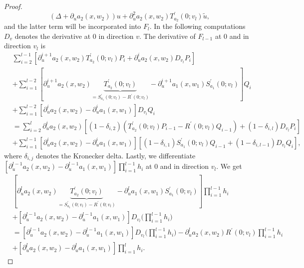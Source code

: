 \documentclass[11pt,a4paper]{amsart}
\theoremstyle{definition}
\numberwithin{equation}{section}
\begin{document}
\begin{proof}
\begin{equation*}
	(\Delta+\partial_{u}a_{2}(x,w_{2}))u + \partial_{u}^{2}a_{2}(x,w_{2})T_{a_{2}}^{\prime}(0;v_{l})\tilde{u},
\end{equation*}
and the latter term will be incorporated into \( F_{l} \).
In the following computations \( D_{v} \) denotes the derivative at \( 0 \) in direction \( v \).
The derivative of \( F_{l-1} \) at \( 0 \) and in direction \( v_{l} \) is
\begin{equation*}
\begin{aligned}
	&\sum_{i=2}^{l-1}[\partial_{u}^{i+1}a_{2}(x,w_{2})T_{a_{2}}^{\prime}(0;v_{l})P_{i} + \partial_{u}^{i}a_{2}(x,w_{2})D_{v_{l}}P_{i}] \\
	&+\sum_{i=1}^{l-2}[\partial_{u}^{i+1}a_{2}(x,w_{2})\underbrace{T_{a_{2}}^{\prime}(0;v_{l})}_{=S_{a_{1}}^{\prime}(0;v_{l})-R^{\prime}(0;v_{l})}-\partial_{u}^{i+1}a_{1}(x,w_{1})S_{a_{1}}^{\prime}(0;v_{l})]Q_{i} \\
	&+\sum_{i=1}^{l-2}[\partial_{u}^{i}a_{2}(x,w_{2})-\partial_{u}^{i}a_{1}(x,w_{1})]D_{v_{l}}Q_{i} \\
	&=\sum_{i=2}^{l}\partial_{u}^{i}a_{2}(x,w_{2})[(1-\delta_{i,2})(T_{a_{2}}^{\prime}(0;v_{l})P_{i-1} - R^{\prime}(0;v_{l})Q_{i-1}) + (1-\delta_{i,l})D_{v_{l}}P_{i}] \\
	&+\sum_{i=1}^{l-1}[\partial_{u}^{i}a_{2}(x,w_{2})-\partial_{u}^{i}a_{1}(x,w_{1})][(1-\delta_{i,1})S_{a_{1}}^{\prime}(0;v_{l})Q_{i-1} + (1-\delta_{i,l-1})D_{v_{l}}Q_{i}],
\end{aligned}
\end{equation*}
where \( \delta_{i,j} \) denotes the Kronecker delta.
Lastly, we differentiate \( [\partial_{u}^{l-1}a_{2}(x,w_{2})-\partial_{u}^{l-1}a_{1}(x,w_{1})]\prod_{i=1}^{l-1}h_{i} \) at 0 and in direction \( v_{l} \).
We get
\begin{equation*}
\begin{aligned}
	&[\partial_{u}^{l}a_{2}(x,w_{2})\underbrace{T_{a_{2}}^{\prime}(0;v_{l})}_{=S_{a_{1}}^{\prime}(0;v_{l})-R^{\prime}(0;v_{l})}-\partial_{u}^{l}a_{1}(x,w_{1})S_{a_{1}}^{\prime}(0;v_{l})]\prod_{i=1}^{l-1}h_{i} \\
	&+ [\partial_{u}^{l-1}a_{2}(x,w_{2})-\partial_{u}^{l-1}a_{1}(x,w_{1})]D_{v_{l}}\Big(\prod_{i=1}^{l-1}h_{i}\Big) \\
	&=[\partial_{u}^{l-1}a_{2}(x,w_{2})-\partial_{u}^{l-1}a_{1}(x,w_{1})]D_{v_{l}}\Big(\prod_{i=1}^{l-1}h_{i}\Big) -\partial_{u}^{l}a_{2}(x,w_{2})R^{\prime}(0;v_{l})\prod_{i=1}^{l-1}h_{i}\\
	& +[\partial_{u}^{l}a_{2}(x,w_{2})-\partial_{u}^{l}a_{1}(x,w_{1})]\prod_{i=1}^{l}h_{i}.

\end{aligned}
\end{equation*}
\end{proof}
\end{document}
